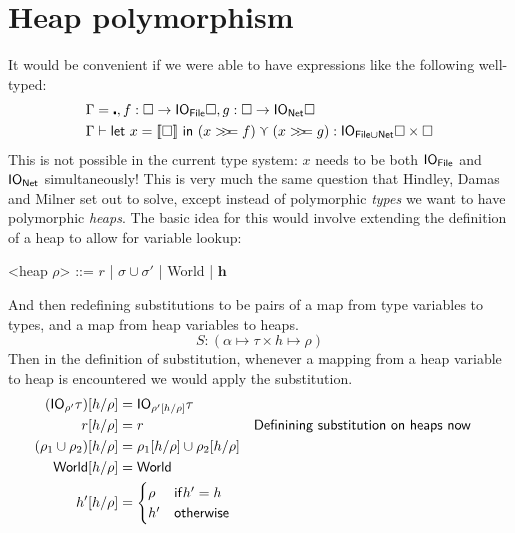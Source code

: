 \section{Heap polymorphism}
It would be convenient if we were able to have expressions like the
following well-typed:
\begin{align*}
\Gamma &= \centerdot , f : \square \rightarrow \IO_{\textsf{File}} \square, g : \square \rightarrow \IO_{\textsf{Net}} \square \\
\Gamma &\vdash \letin{x = \llbracket \square \rrbracket}{(x \bind f) \curlyvee (x \bind g)} : \IO_{\textsf{File} \cup
  \textsf{Net}} \square \times \square
\end{align*}
This is not possible in the current type system: $x$ needs to be both
$\mathsf{IO}_{\textsf{File}}$ and $\mathsf{IO}_{\textsf{Net}}$ simultaneously! This is
very much the same question that Hindley, Damas and Milner set out to
solve, except instead of polymorphic \textit{types} we want to have
polymorphic \textit{heaps}.
The basic idea for this would involve extending the definition of a
heap to allow for variable lookup:
\begin{grammar}
  <heap $\rho$> ::= $r$ | $\sigma \cup \sigma'$ | \textsf{World} | $\textbf{h}$
\end{grammar}
And then redefining substitutions to be pairs of a map from
type variables to types, and a map from heap variables to heaps.
$$ S : ( \alpha \mapsto \tau \times h \mapsto \rho ) $$
Then in the definition of substitution, whenever a mapping from a heap
variable to heap is encountered we would apply the substitution.
\begin{align*}
  (\mathsf{IO}_{\rho'} \tau)[h/\rho] &= \mathsf{IO}_{\rho'[h/\rho]} \tau \\
  r[h/\rho] &= r  && \textsf{Definining substitution on heaps now} \\
  (\rho_1 \cup \rho_2)[h/\rho] &= \rho_1[h/\rho] \cup \rho_2[h/\rho] \\
  \textsf{World}[h/\rho] &= \textsf{World} \\
  h'[h/\rho] &=
            \begin{cases}
              \rho & \mathsf{if} h' = h \\
              h' & \mathsf{otherwise}
            \end{cases}
\end{align*}

